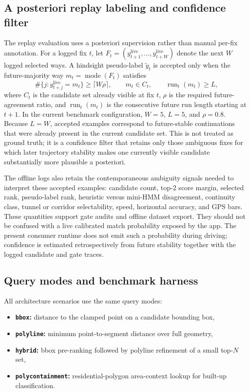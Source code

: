 \documentclass{article}
\begin{document}
\subsection{A posteriori replay labeling and confidence filter}
The replay evaluation uses a posteriori supervision rather than manual per-fix annotation. For a logged fix \(t\), let \(F_t=(y^{\mathrm{live}}_{t+1},\dots,y^{\mathrm{live}}_{t+W})\) denote the next \(W\) logged selected ways. A hindsight pseudo-label \(\tilde y_t\) is accepted only when the future-majority way \(m_t=\operatorname{mode}(F_t)\) satisfies
\[
\#\{j : y^{\mathrm{live}}_{t+j}=m_t\} \ge \lceil W\rho \rceil,\qquad
m_t \in C_t,\qquad
\operatorname{run}_t(m_t) \ge L,
\]
where \(C_t\) is the candidate set already visible at fix \(t\), \(\rho\) is the required future-agreement ratio, and \(\operatorname{run}_t(m_t)\) is the consecutive future run length starting at \(t+1\). In the current benchmark configuration, \(W=5\), \(L=5\), and \(\rho=0.8\). Because \(L=W\), accepted examples correspond to future-stable continuations that were already present in the current candidate set. This is not treated as ground truth; it is a confidence filter that retains only those ambiguous fixes for which later trajectory stability makes one currently visible candidate substantially more plausible a posteriori.

The offline logs also retain the contemporaneous ambiguity signals needed to interpret these accepted examples: candidate count, top-2 score margin, selected rank, pseudo-label rank, heuristic versus mini-HMM disagreement, continuity class, tunnel or corridor selectability, speed, horizontal accuracy, and GPS bars. These quantities support gate audits and offline dataset export. They should not be confused with a live calibrated match probability exposed by the app. The present consumer runtime does not emit such a probability during driving; confidence is estimated retrospectively from future stability together with the logged candidate and gate traces.

\subsection{Query modes and benchmark harness}
All architecture scenarios use the same query modes:
\begin{itemize}
\item \textbf{\texttt{bbox}:} distance to the clamped point on a candidate bounding box,
\item \textbf{\texttt{polyline}:} minimum point-to-segment distance over full geometry,
\item \textbf{\texttt{hybrid}:} bbox pre-ranking followed by polyline refinement of a small top-\(N\) set,
\item \textbf{\texttt{polycontainment}:} residential-polygon area-context lookup for built-up classification.
\end{itemize}
\end{document}
